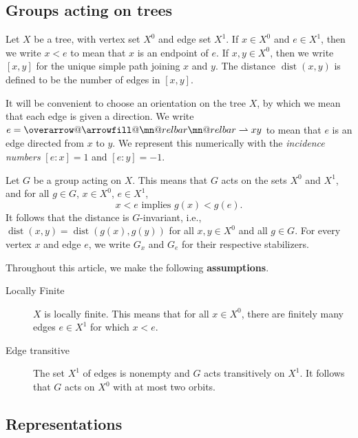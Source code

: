 \documentclass[letter]{amsart}
\makeatletter
\theoremstyle{definition}
\theoremstyle{remark}
\numberwithin{thm}{section}
\numberwithin{equation}{section}
\DeclareRobustCommand{\overrightharpoon}{\mathpalette{\overarrow@\rightharpoonfill@}}
\def\rightharpoonfill@{\arrowfill@\mn@relbar\mn@relbar\rightharpoonup}
\newcommand{\edge}[1]{\overrightharpoon{#1}}
\DeclareMathOperator{\dist}{dist}
\makeatother
\begin{document}
\subsection{Groups acting on trees}
\label{conventions}
Let $X$ be a tree, with vertex set $X^0$ and edge set $X^1$.  If $x \in X^0$ and $e \in X^1$, then we write $x < e$ to mean that $x$ is an endpoint of $e$.  If $x,y \in X^0$, then we write $[x,y]$ for the unique simple path joining $x$ and $y$.  The distance $\dist(x,y)$ is defined to be the number of edges in $[x,y]$.  

It will be convenient to choose an orientation on the tree $X$, by which we mean that each edge is given a direction.  We write $e = \edge{xy}$ to mean that $e$ is an edge directed from $x$ to $y$.  We represent this numerically with the {\em incidence numbers} $[e:x] = 1$ and $[e:y] = -1$.  

Let $G$ be a group acting on $X$.  This means that $G$ acts on the sets $X^0$ and $X^1$, and for all $g \in G$, $x \in X^0$, $e \in X^1$, 
$$x < e \text{ implies } g(x) < g(e).$$
It follows that the distance is $G$-invariant, i.e., $\dist(x,y) = \dist( g(x), g(y) )$ for all $x,y \in X^0$ and all $g \in G$.  For every vertex $x$ and edge $e$, we write $G_x$ and $G_e$ for their respective stabilizers.  

Throughout this article, we make the following \textbf{assumptions}.
\begin{description}
\item[Locally Finite]
$X$ is locally finite.  This means that for all $x \in X^0$, there are finitely many edges $e \in X^1$ for which $x < e$.
\item[Edge transitive]
The set $X^1$ of edges is nonempty and $G$ acts transitively on $X^1$.  It follows that $G$ acts on $X^0$ with at most two orbits.  %
\end{description}


\subsection{Representations}
\end{document}
